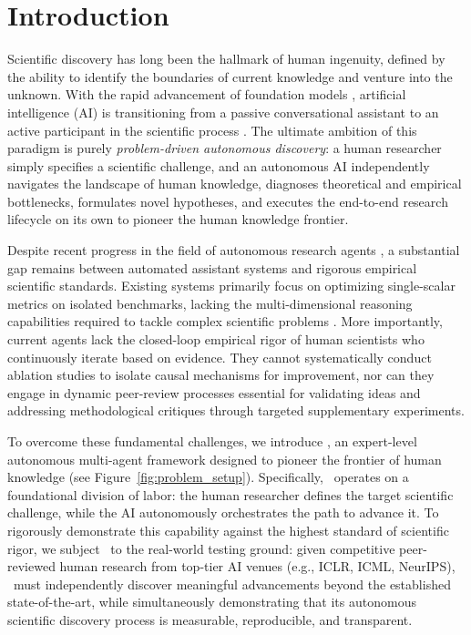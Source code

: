
\section{Introduction}



Scientific discovery has long been the hallmark of human ingenuity, defined by the ability to identify the boundaries of current knowledge and venture into the unknown. With the rapid advancement of foundation models \citep{team2023gemini, liu2024deepseek, singh2025openai}, artificial intelligence (AI) is transitioning from a passive conversational assistant to an active participant in the scientific process \citep{xu2025comprehensive, meng2026scientistone,jansen2025codescientist}. The ultimate ambition of this paradigm is purely \emph{problem-driven autonomous discovery}: a human researcher simply specifies a scientific challenge, and an autonomous AI independently navigates the landscape of human knowledge, diagnoses theoretical and empirical bottlenecks, formulates novel hypotheses, and executes the end-to-end research lifecycle on its own to pioneer the human knowledge frontier.

Despite recent progress in the field of autonomous research agents \citep{tang2026ai,weng2025deepscientist,yamada2025ai}, a substantial gap remains between automated assistant systems and rigorous empirical scientific standards. Existing systems primarily focus on optimizing single-scalar metrics on isolated benchmarks, lacking the multi-dimensional reasoning capabilities required to tackle complex scientific problems \citep{chen2026mars,jin2026toward}. More importantly, current agents lack the closed-loop empirical rigor of human scientists who continuously iterate based on evidence. They cannot systematically conduct ablation studies to isolate causal mechanisms for improvement, nor can they engage in dynamic peer-review processes essential for validating ideas and addressing methodological critiques through targeted supplementary experiments.

To overcome these fundamental challenges, we introduce \emph{\sname}, an expert-level autonomous multi-agent framework designed to pioneer the frontier of human knowledge (see Figure~\ref{fig:problem_setup}). Specifically, \sname~operates on a foundational division of labor: the human researcher defines the target scientific challenge, while the AI autonomously orchestrates the path to advance it. To rigorously demonstrate this capability against the highest standard of scientific rigor, we subject \sname~to the real-world testing ground: given competitive peer-reviewed human research from top-tier AI venues (e.g., ICLR, ICML, NeurIPS), \sname~must independently discover meaningful advancements beyond the established state-of-the-art, while simultaneously demonstrating that its autonomous scientific discovery process is measurable, reproducible, and transparent.

